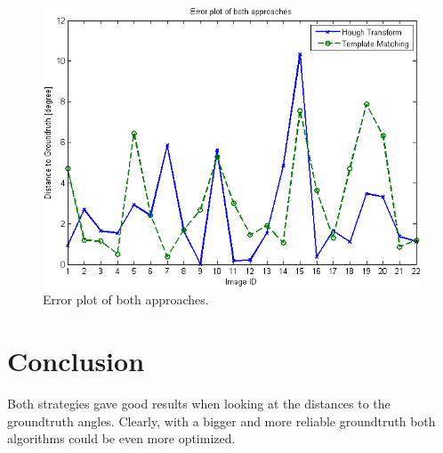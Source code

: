 \documentclass[10pt,twocolumn,letterpaper]{article}
\begin{document}
\begin{figure}
	\begin{center}		
		\includegraphics[width=1\linewidth]{img/errorPlot2}
	\end{center}
	\caption{Error plot of both approaches.}
	\label{fig:errorPlot}
	
\end{figure}


\section{Conclusion}
Both strategies gave good results when looking at the distances to the groundtruth angles. Clearly, with a bigger and more reliable groundtruth both algorithms could be even more optimized.

{\small


}
\end{document}
